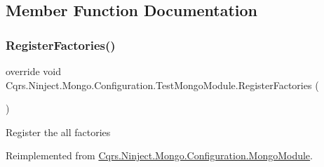 \subsection{Member Function Documentation}
\mbox{\label{classCqrs_1_1Ninject_1_1Mongo_1_1Configuration_1_1TestMongoModule_a8cce844ec177b88a0be2ca8f71b2bc6b}} 
\subsubsection{\texorpdfstring{Register\+Factories()}{RegisterFactories()}}
{\footnotesize\ttfamily override void Cqrs.\+Ninject.\+Mongo.\+Configuration.\+Test\+Mongo\+Module.\+Register\+Factories (\begin{DoxyParamCaption}{ }\end{DoxyParamCaption})\hspace{0.3cm}{\ttfamily [virtual]}}



Register the all factories 



Reimplemented from \hyperlink{classCqrs_1_1Ninject_1_1Mongo_1_1Configuration_1_1MongoModule_a052d4cd960c3c5da037a04e43424c9c8}{Cqrs.\+Ninject.\+Mongo.\+Configuration.\+Mongo\+Module}.

